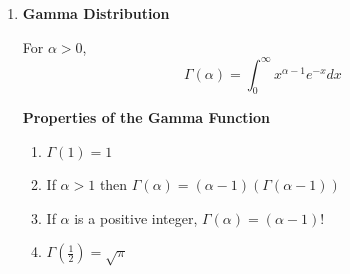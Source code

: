 \documentclass[12pt]{article}
\begin{document}
\begin{enumerate}
{	\begin{proof}
		\begin{align*}
			 \sqrt{2\pi} = I &= \int^{\infty}_{-\infty} e^{-(1/2)x^2} dx  && \text{(so we need to prove that $I = \sqrt{2\pi}$)}\\
			I &= \int^{\infty}_{-\infty} e^{-(1/2)y^2} dy  && \text{(Variable change)}\\
			I^2 &= \int^{\infty}_{-\infty} \int^{\infty}_{-\infty} e^{-(1/2)y^2} e^{-(1/2)x^2} dy dx && \text{("just assume this is true" - Mahinda)}\\
			&= \int^{\infty}_{-\infty} \int^{\infty}_{-\infty} e^{-(1/2)(y^2 + x^2)} dx dy\\
			&= \int^{2\pi}_{0} \int^{\infty}_{0} e^{-(1/2)(r^2 cos^2 \theta + r^2 sin^2 \theta)} r dr \int^{2\pi}_{0} && \text{(change to polar coordinates)}\\
			&=\int^{2\pi}_{0} [-e^{-(1/2)r^2}]^{\infty}_{0} d\theta\\
			&=\int^{2\pi}_{0} 1 d\theta\\
			I^2 &= 2\pi\\
			I &= \sqrt{2\pi}
		\end{align*}
	\end{proof}

	\textbf{Considering} $N(\mu, \sigma^2), f_X (x) = \frac{1}{\sigma \sqrt{2\pi}} e^{-(1/2)(\frac{x - \mu}{\sigma})^2}$
	
		$$\int^{\infty}_\infty \frac{1}{\sigma \sqrt{2\pi}} e^{-(1/2)(\frac{x - \mu}{\sigma})^2} dx$$
		
		\begin{tcolorbox}
			sub $z = \frac{x - \mu}{\sigma}$ we also get:
			$$dz = \frac{1}{\sigma} dx$$
		\end{tcolorbox}
		
		so now we have 
		$$\int^{\infty}_\infty \frac{1}{\sigma \sqrt{2\pi}} e^{-(1/2)z^2} \sigma dz = \int^{\infty}_\infty \frac{1}{\sqrt{2\pi}} e^{-(1/2)z^2} dz$$
		And this is the standard normal distribution

	}
	\item{
	\textbf{Gamma Distribution}
	
	\begin{tcolorbox}[title=Definition: Gamma Function]
		For $\alpha > 0$, $$\Gamma (\alpha) = \int^\infty_0 x^{\alpha - 1} e^{-x} dx$$
	\end{tcolorbox}

	\textbf{Properties of the Gamma Function}
	\begin{enumerate}
		\item{$\Gamma (1) = 1$}
		\item{If $\alpha > 1$ then $\Gamma (\alpha) = (\alpha - 1)(\Gamma (\alpha - 1))$}
		\item{If $\alpha$ is a positive integer, $\Gamma (\alpha) = (\alpha - 1)!$}
		\item{$\Gamma (\frac{1}{2}) = \sqrt{\pi}$}
	\end{enumerate}

}
\end{enumerate}
\end{document}
